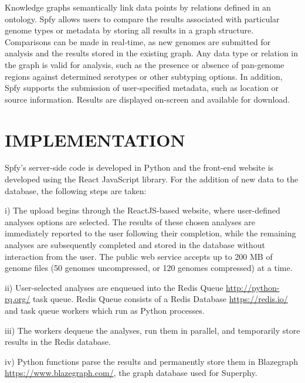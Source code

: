 \documentclass[a4,center,fleqn]{NAR}
\begin{document}

Knowledge graphs semantically link data points by relations defined in an ontology. Spfy allows users to compare the results associated with particular genome types or metadata by storing all results in a graph structure. Comparisons can be made in real-time, as new genomes are submitted for analysis and the results stored in the existing graph. Any data type or relation in the graph is valid for analysis, such as the presence or absence of pan-genome regions against determined serotypes or other subtyping options. In addition, Spfy supports the submission of user-specified metadata, such as location or source information. Results are displayed on-screen and available for download.

\section{IMPLEMENTATION}
Spfy's server-side code is developed in Python and the front-end website is developed using the React JavaScript library. For the addition of new data to the database, the following steps are taken:

i) The upload begins through the ReactJS-based website, where user-defined analyses options are selected. The results of these chosen analyses are immediately reported to the user following their completion, while the remaining analyses are subsequently completed and stored in the database without interaction from the user. The public web service accepts up to 200 MB of genome files (50 genomes uncompressed, or 120 genomes compressed) at a time.

ii) User-selected analyses are enqueued into the Redis Queue \url{http://python-rq.org/} task queue. Redis Queue consists of a Redis Database \url{https://redis.io/} and task queue workers which run as Python processes.

iii) The workers dequeue the analyses, run them in parallel, and temporarily store results in the Redis database.

iv) Python functions parse the results and permanently store them in Blazegraph \url{https://www.blazegraph.com/}, the graph database used for Superphy.
\end{document}
